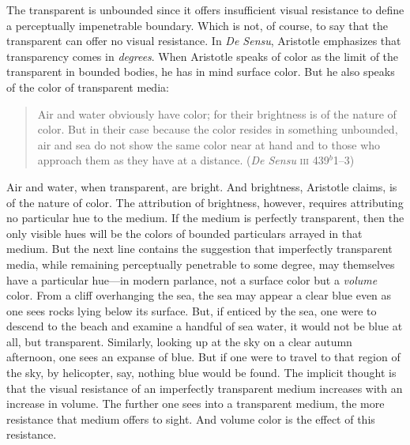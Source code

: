 \documentclass[12pt]{article}
\begin{document}
The transparent is unbounded since it offers insufficient visual resistance to define a perceptually impenetrable boundary. Which is not, of course, to say that the transparent can offer no visual resistance. In \emph{De Sensu}, Aristotle emphasizes that transparency comes in \emph{degrees}. When Aristotle speaks of color as the limit of the transparent in bounded bodies, he has in mind surface color. But he also speaks of the color of transparent media:
\begin{quote}
    Air and water obviously have color; for their brightness is of the nature of color. But in their case because the color resides in something unbounded, air and sea do not show the same color near at hand and to those who approach them as they have at a distance. (\emph{De Sensu} \textsc{iii} 439\( ^{b} \)1--3)
\end{quote}
Air and water, when transparent, are bright. And brightness, Aristotle claims, is of the nature of color. The attribution of brightness, however, requires attributing no particular hue to the medium. If the medium is perfectly transparent, then the only visible hues will be the colors of bounded particulars arrayed in that medium. But the next line contains the suggestion that imperfectly transparent media, while remaining perceptually penetrable to some degree, may themselves have a particular hue---in modern parlance, not a surface color but a \emph{volume} color. From a cliff overhanging the sea, the sea may appear a clear blue even as one sees rocks lying below its surface. But, if enticed by the sea, one were to descend to the beach and examine a handful of sea water, it would not be blue at all, but transparent. Similarly, looking up at the sky on a clear autumn afternoon, one sees an expanse of blue. But if one were to travel to that region of the sky, by helicopter, say, nothing blue would be found. The implicit thought is that the visual resistance of an imperfectly transparent medium increases with an increase in volume. The further one sees into a transparent medium, the more resistance that medium offers to sight. And volume color is the effect of this resistance.
\end{document}

